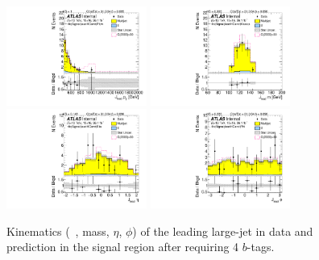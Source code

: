 \begin{figure}[htb!]
\begin{center}
\includegraphics[width=0.41\textwidth,angle=-90]{figures/boosted/Signal/b77_FourTag_Signal_leadHCand_Pt_m.pdf}
\includegraphics[width=0.41\textwidth,angle=-90]{figures/boosted/Signal/b77_FourTag_Signal_leadHCand_Mass_s.pdf}\\
\includegraphics[width=0.41\textwidth,angle=-90]{figures/boosted/Signal/b77_FourTag_Signal_leadHCand_Eta.pdf}
\includegraphics[width=0.41\textwidth,angle=-90]{figures/boosted/Signal/b77_FourTag_Signal_leadHCand_Phi.pdf}
  \caption{Kinematics (\pt~, mass, $\eta$, $\phi$) of the leading large-\R jet in data and prediction in the signal region after requiring 4 $b$-tags. }
  \label{fig:boosted-4b-signal-ak10-lead}
\end{center}
\end{figure}

